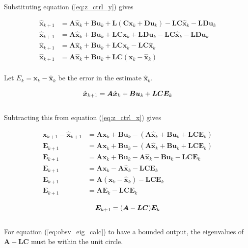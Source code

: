 \documentclass[10pt,conference,compsoc]{IEEEtran}
\newcommand{\mtx}[1] {\bm #1}
\begin{document}
\noindent Substituting equation (\ref{eq:z_ctrl_y}) gives

\begin{align*}
  \hat{\mtx{x}}_{k+1} &= \mtx{A}\hat{\mtx{x}}_k + \mtx{B}\mtx{u}_k +
    \mtx{L}(\mtx{C}\mtx{x}_k + \mtx{D}\mtx{u}_k) -
    \mtx{L}\mtx{C}\hat{\mtx{x}}_k - \mtx{L}\mtx{D}\mtx{u}_k \\
  \hat{\mtx{x}}_{k+1} &= \mtx{A}\hat{\mtx{x}}_k + \mtx{B}\mtx{u}_k +
    \mtx{L}\mtx{C}\mtx{x}_k + \mtx{L}\mtx{D}\mtx{u}_k -
    \mtx{L}\mtx{C}\hat{\mtx{x}}_k - \mtx{L}\mtx{D}\mtx{u}_k \\
  \hat{\mtx{x}}_{k+1} &= \mtx{A}\hat{\mtx{x}}_k + \mtx{B}\mtx{u}_k +
    \mtx{L}\mtx{C}\mtx{x}_k - \mtx{L}\mtx{C}\hat{\mtx{x}}_k \\
  \hat{\mtx{x}}_{k+1} &= \mtx{A}\hat{\mtx{x}}_k + \mtx{B}\mtx{u}_k +
    \mtx{L}\mtx{C}(\mtx{x}_k - \hat{\mtx{x}}_k) \\
\end{align*}

\noindent Let $E_k = \mtx{x}_k - \hat{\mtx{x}}_k$ be the error in the estimate
$\hat{\mtx{x}}_k$.

\begin{equation*}
  \hat{\mtx{x}}_{k+1} = \mtx{A}\hat{\mtx{x}}_k + \mtx{B}\mtx{u}_k +
    \mtx{L}\mtx{C}\mtx{E}_k \\
\end{equation*}
\\
\noindent Subtracting this from equation (\ref{eq:z_ctrl_x}) gives

\begin{align*}
  \mtx{x}_{k+1} - \hat{\mtx{x}}_{k+1} &= \mtx{A}\mtx{x}_k + \mtx{B}\mtx{u}_k -
    (\mtx{A}\hat{\mtx{x}}_k + \mtx{B}\mtx{u}_k +
     \mtx{L}\mtx{C}\mtx{E}_k) \\
  \mtx{E}_{k+1} &= \mtx{A}\mtx{x}_k + \mtx{B}\mtx{u}_k -
    (\mtx{A}\hat{\mtx{x}}_k + \mtx{B}\mtx{u}_k + \mtx{L}\mtx{C}\mtx{E}_k) \\
  \mtx{E}_{k+1} &= \mtx{A}\mtx{x}_k + \mtx{B}\mtx{u}_k -
    \mtx{A}\hat{\mtx{x}}_k - \mtx{B}\mtx{u}_k - \mtx{L}\mtx{C}\mtx{E}_k \\
  \mtx{E}_{k+1} &= \mtx{A}\mtx{x}_k - \mtx{A}\hat{\mtx{x}}_k -
    \mtx{L}\mtx{C}\mtx{E}_k \\
  \mtx{E}_{k+1} &= \mtx{A}(\mtx{x}_k - \hat{\mtx{x}}_k) -
    \mtx{L}\mtx{C}\mtx{E}_k \\
  \mtx{E}_{k+1} &= \mtx{A}\mtx{E}_k - \mtx{L}\mtx{C}\mtx{E}_k
\end{align*}

\begin{equation} \label{eq:obsv_eig_calc}
  \mtx{E}_{k+1} = (\mtx{A} - \mtx{L}\mtx{C})\mtx{E}_k \\
\end{equation}
\\
\noindent For equation (\ref{eq:obsv_eig_calc}) to have a bounded output, the
eigenvalues of $\mtx{A} - \mtx{L}\mtx{C}$ must be within the unit circle. \\
\end{document}
